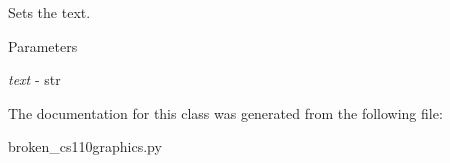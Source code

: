 Sets the text. 
\begin{DoxyParams}{Parameters}
\item[{\em text}]-\/ str \end{DoxyParams}


The documentation for this class was generated from the following file:\begin{DoxyCompactItemize}
\item 
broken\_\-cs110graphics.py\end{DoxyCompactItemize}
